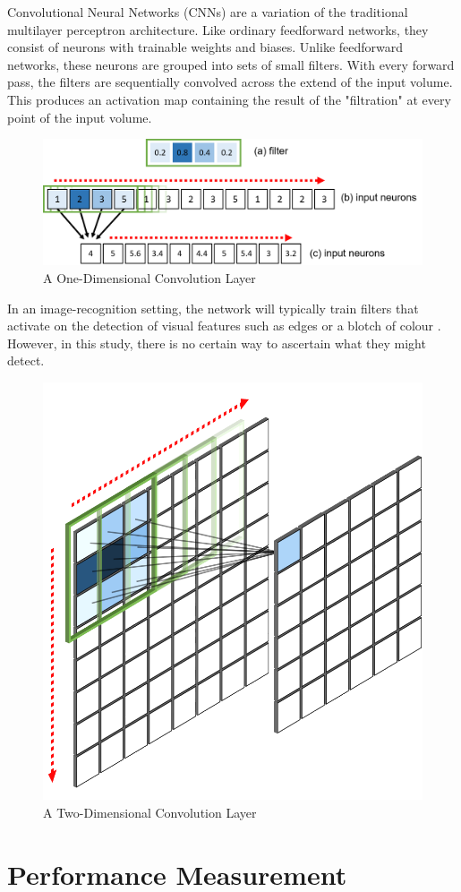 \documentclass[11pt,oneside,openany,a4paper,english, report, goldenblock
]{usthesis}
\begin{document}
Convolutional Neural Networks (CNNs) are a variation of the traditional multilayer perceptron architecture. Like ordinary feedforward networks, they consist of neurons with trainable weights and biases. Unlike feedforward networks, these neurons are grouped into sets of small filters. With every forward pass, the filters are sequentially convolved across the extend of the input volume. This produces an activation map containing the result of the "filtration" at every point of the input volume.

\begin{figure}[h]
	\centering
	\includegraphics[width=0.9\linewidth]{1D_Convolution}
	\caption[1D Convolutional Layer]{A One-Dimensional Convolution Layer}
	\label{fig:1dconvolution}
\end{figure}

In an image-recognition setting, the network will typically train filters that activate on the detection of visual features such as edges or a blotch of colour \citep{cs231n}. However, in this study, there is no certain way to ascertain what they might detect.

\begin{figure}[h]
	\centering
	\includegraphics[width=0.4\linewidth]{2D_Convolution}
	\caption[2D Convolution Layer]{A Two-Dimensional Convolution Layer}
	\label{fig:2dconvolution}
\end{figure}


\section{Performance Measurement}
\end{document}
